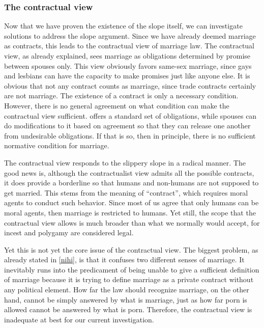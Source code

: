 \documentclass{article}
\begin{document}
\subsubsection{The contractual view}

Now that we have proven the existence of the slope itself, we can investigate solutions to address the slope argument. Since we have already deemed marriage as contracts, this leads to the contractual view of marriage law. The contractual view, as already explained, sees marriage as obligations determined by promise between spouses only.\autocite{brakeMarriageDomesticPartnership2023} This view obviously favors same-sex marriage, since gays and lesbians can have the capacity to make promises just like anyone else. It is obvious that not any contract counts as marriage, since trade contracts certainly are not marriage. The existence of a contract is only a necessary condition. However, there is no general agreement on what condition can make the contractual view sufficient.\autocite{morseWhyUnilateralDivorce2006,houlgateChildrenRightsState2005} \textcite{wasserstromAdulteryImmoral1974} offers a standard set of obligations, while spouses can do modifications to it based on agreement so that they can release one another from undesirable obligations. If that is so, then in principle, there is no sufficient normative condition for marriage.

The contractual view responds to the slippery slope in a radical manner. The good news is, although the contractualist view admits all the possible contracts, it does provide a borderline so that humans and non-humans are not supposed to get married. This stems from the meaning of ``contract'', which requires moral agents to conduct such behavior. Since most of us agree that only humans can be moral agents, then marriage is restricted to humans. Yet still, the scope that the contractual view allows is much broader than what we normally would accept, for incest and polygamy are considered legal.

Yet this is not yet the core issue of the contractual view. The biggest problem, as already stated in \ref{nihi}, is that it confuses two different senses of marriage. It inevitably runs into the predicament of being unable to give a sufficient definition of marriage because it is trying to define marriage as a private contract without any political element. How far the law should recognize marriage, on the other hand, cannot be simply answered by what is marriage, just as how far porn is allowed cannot be answered by what is porn. Therefore, the contractual view is inadequate at best for our current investigation.
\end{document}

